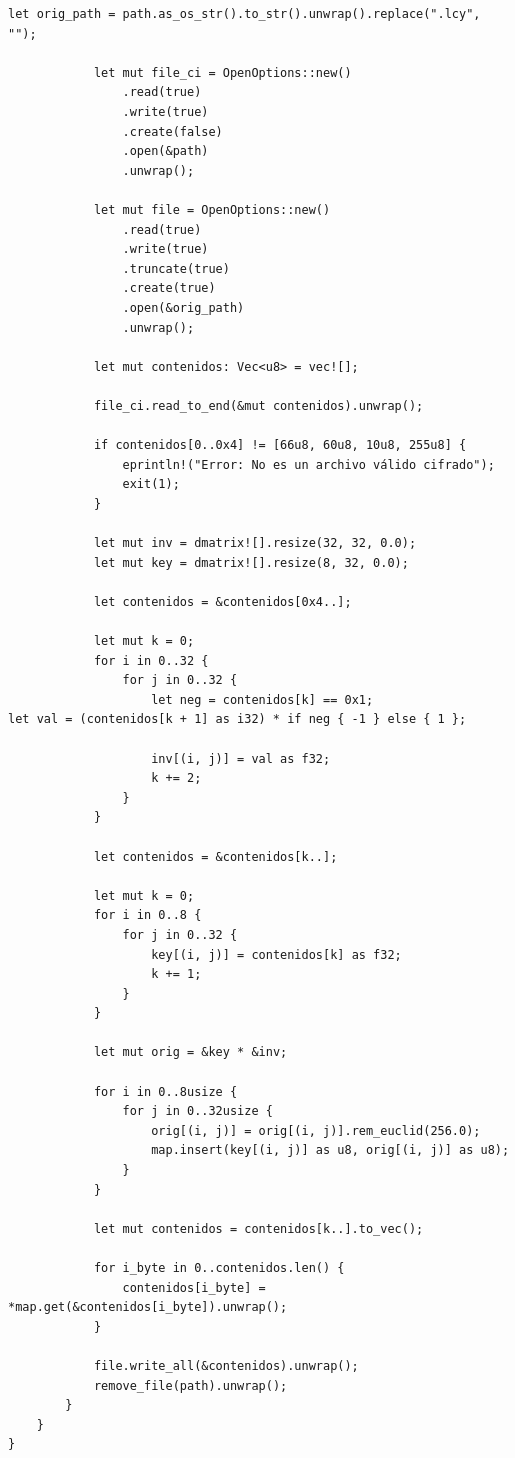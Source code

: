 \documentclass[a4paper]{article}
\begin{document}
\begin{verbatim}
let orig_path = path.as_os_str().to_str().unwrap().replace(".lcy", "");

            let mut file_ci = OpenOptions::new()
                .read(true)
                .write(true)
                .create(false)
                .open(&path)
                .unwrap();

            let mut file = OpenOptions::new()
                .read(true)
                .write(true)
                .truncate(true)
                .create(true)
                .open(&orig_path)
                .unwrap();

            let mut contenidos: Vec<u8> = vec![];

            file_ci.read_to_end(&mut contenidos).unwrap();

            if contenidos[0..0x4] != [66u8, 60u8, 10u8, 255u8] {
                eprintln!("Error: No es un archivo válido cifrado");
                exit(1);
            }

            let mut inv = dmatrix![].resize(32, 32, 0.0);
            let mut key = dmatrix![].resize(8, 32, 0.0);

            let contenidos = &contenidos[0x4..];

            let mut k = 0;
            for i in 0..32 {
                for j in 0..32 {
                    let neg = contenidos[k] == 0x1;
let val = (contenidos[k + 1] as i32) * if neg { -1 } else { 1 };

                    inv[(i, j)] = val as f32;
                    k += 2;
                }
            }

            let contenidos = &contenidos[k..];

            let mut k = 0;
            for i in 0..8 {
                for j in 0..32 {
                    key[(i, j)] = contenidos[k] as f32;
                    k += 1;
                }
            }

            let mut orig = &key * &inv;

            for i in 0..8usize {
                for j in 0..32usize {
                    orig[(i, j)] = orig[(i, j)].rem_euclid(256.0);
                    map.insert(key[(i, j)] as u8, orig[(i, j)] as u8);
                }
            }

            let mut contenidos = contenidos[k..].to_vec();

            for i_byte in 0..contenidos.len() {
                contenidos[i_byte] = *map.get(&contenidos[i_byte]).unwrap();
            }

            file.write_all(&contenidos).unwrap();
            remove_file(path).unwrap();
        }
    }
}

\end{verbatim}
\end{document}
